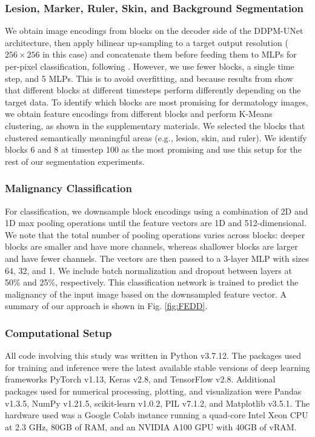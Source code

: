 \documentclass[11pt]{ucthesis}
\begin{document}
\subsubsection{Lesion, Marker, Ruler, Skin, and Background Segmentation}
We obtain image encodings from blocks on the decoder side of the DDPM-UNet architecture, then apply bilinear up-sampling to a target output resolution ($256\times256$ in this case) and concatenate them before feeding them to MLPs for per-pixel classification, following \cite{baranchuk_2022_labelefficient}. However, we use fewer blocks, a single time step, and 5 MLPs. This is to avoid overfitting, and because results from \cite{baranchuk_2022_labelefficient} show that different blocks at different timesteps perform differently depending on the target data. To identify which blocks are most promising for dermatology images, we obtain feature encodings from different blocks and perform K-Means clustering, as shown in the supplementary materials. We selected the blocks that clustered semantically meaningful areas (e.g., lesion, skin, and ruler). We identify blocks 6 and 8 at timestep 100 as the most promising and use this setup for the rest of our segmentation experiments.

\subsubsection{Malignancy Classification}
For classification, we downsample block encodings using a combination of 2D and 1D max pooling operations until the feature vectors are 1D and 512-dimensional. We note that the total number of pooling operations varies across blocks: deeper blocks are smaller and have more channels, whereas shallower blocks are larger and have fewer channels. The vectors are then passed to a 3-layer MLP with sizes 64, 32, and 1. We include batch normalization and dropout between layers at 50\% and 25\%, respectively. This classification network is trained to predict the malignancy of the input image based on the downsampled feature vector. A summary of our approach is shown in Fig. \ref{fig:FEDD}.

\subsubsection{Computational Setup}
All code involving this study was written in Python v3.7.12. The packages used for training and inference were the latest available stable versions of deep learning frameworks PyTorch v1.13, Keras v2.8, and TensorFlow v2.8. Additional packages used for numerical processing, plotting, and visualization were Pandas v1.3.5, NumPy v1.21.5, scikit-learn v1.0.2, PIL v7.1.2, and Matplotlib v3.5.1. The hardware used was a Google Colab instance running a quad-core Intel Xeon CPU at 2.3 GHz, 80GB of RAM, and an NVIDIA A100 GPU with 40GB of vRAM.
\end{document}
